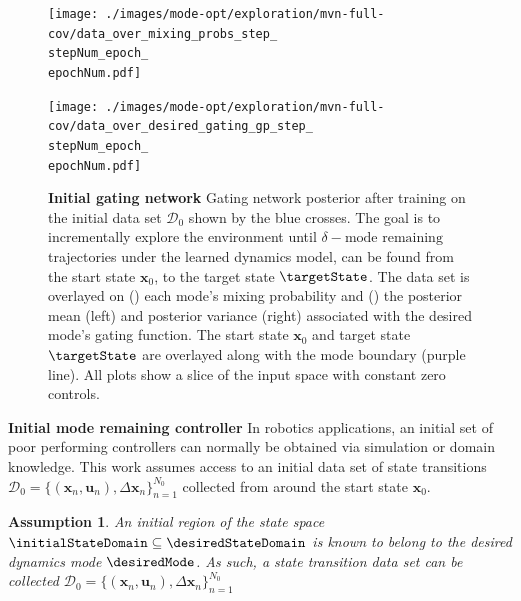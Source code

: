 \documentclass{mimosis-class/mimosis}
\newtheorem{assumption}{Assumption}[section]
\numberwithin{equation}{chapter}
\newcommand{\state}{\ensuremath{\mathbf{x}}}
\newcommand{\control}{\ensuremath{\mathbf{u}}}
\newcommand{\dataset}{\ensuremath{\mathcal{D}}}
\begin{document}
{\renewcommand{\stepNum}{0}
\renewcommand{\epochNum}{0}
\begin{figure}
\centering
\begin{minipage}[r]{\columnwidth}
\centering
\texttt{[image: ./images/mode-opt/exploration/mvn-full-cov/data\_over\_mixing\_probs\_step\_\\stepNum\_epoch\_\\epochNum.pdf]}
\subcaption{}
\label{fig-explorative-data-over-prob-7-initial}
\end{minipage}
\begin{minipage}[r]{\columnwidth}
\centering
\texttt{[image: ./images/mode-opt/exploration/mvn-full-cov/data\_over\_desired\_gating\_gp\_step\_\\stepNum\_epoch\_\\epochNum.pdf]}
\subcaption{}
\label{fig-explorative-data-over-svgp-7-initial}
\end{minipage}
\caption[Gating network posterior at initial iteration of \acrshort{modeopt}]{\textbf{Initial gating network} Gating network posterior after training on the initial data set $\dataset_0$
shown by the blue crosses.
The goal is to incrementally explore the environment until $\delta-\text{mode remaining}$ trajectories
under the learned dynamics model, can be found from the start state $\state_0$, to the target state $\targetState$.
The data set is overlayed on
()
each mode's mixing probability
and ()
the posterior mean (left) and posterior variance (right) associated with the desired mode's gating function.
The start state $\state_0$ and target state $\targetState$ are overlayed along with the mode boundary (purple line).
All plots show a slice of the input space with constant zero controls.}
\label{fig-explorative-traj-opt-7-initial}
\end{figure}
\textbf{Initial mode remaining controller}
In robotics applications, an initial set of poor performing controllers can normally be obtained via
simulation or domain knowledge.
This work assumes access to an initial data set of state transitions
\(\dataset_0 = \{(\state_n, \control_n), \Delta \state_n\}_{n=1}^{N_0}\) collected from around the start state \(\state_0\).
\begin{assumption} \label{}
An initial region of the state space $\initialStateDomain \subseteq \desiredStateDomain$ is known to belong to the desired
dynamics mode $\desiredMode$.
As such, a state transition data set can be collected
$\dataset_0 = \{(\state_n, \control_n), \Delta \state_n\}_{n=1}^{N_0}$

\end{assumption}}
\end{document}
